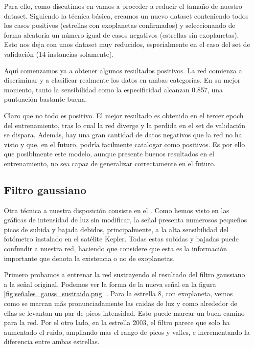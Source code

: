 Para ello, como discutimos en  vamos a proceder a reducir el tamaño de nuestro dataset. Siguiendo la técnica básica, creamos un nuevo dataset conteniendo todos los casos positivos (estrellas con exoplanetas confirmados) y seleccionando de forma aleatoria un número igual de casos negativos (estrellas sin exoplanetas). Esto nos deja con unos dataset muy reducidos, especialmente en el caso del set de validación (14 instancias solamente).

Aquí comenzamos ya a obtener algunos resultados positivos. La red comienza a discriminar y a clasificar realmente los datos en ambas categorías. En su mejor momento, tanto la sensibilidad como la especificidad alcanzan 0.857, una puntuación bastante buena. 

Claro que no todo es positivo. El mejor resultado es obtenido en el tercer epoch del entrenamiento, tras lo cual la red diverge y la perdida en el set de validación se dispara. Además, hay una gran cantidad de datos negativos que la red no ha visto y que, en el futuro, podría facilmente catalogar como positivos. Es por ello que posiblmente este modelo, aunque presente buenos resultados en el entrenamiento, no sea capaz de generalizar correctamente en el futuro.

\subsection{Filtro gaussiano}

Otra técnica a nuestra disposición consiste en el . Como hemos visto en las gráficas de intensidad de luz sin modificar, la señal presenta numerosos pequeños picos de subida y bajada debidos, principalmente, a la alta sensibilidad del fotómetro instalado en el satélite Kepler. Todas estas subidas y bajadas puede confundir a nuestra red, haciendo que considere que esta es la información importante que denota la existencia o no de exoplanetas.

Primero probamos a entrenar la red sustrayendo el resultado del filtro gaussiano a la señal original. Podemos ver la forma de la nueva señal en la figura \ref{fig:señales_gauss_sustraido.png} . Para la estrella 8, con exoplaneta, vemos como se marcan más pronunciadamente las caidas de luz y como alrededor de ellas se levantan un par de picos intensidad. Esto puede marcar un buen camino para la red. Por el otro lado, en la estrella 2003, el filtro parece que solo ha aumentado el ruido, ampliando mas el rango de picos y valles, e incrementando la diferencia entre ambas estrellas.

